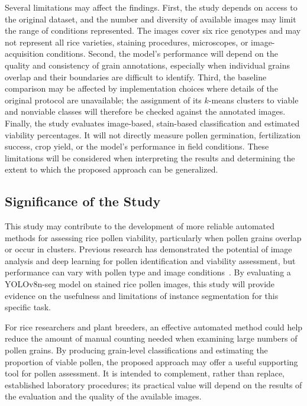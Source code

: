 Several limitations may affect the findings. First, the study depends on access to the original dataset, and the number and diversity of available images may limit the range of conditions represented. The images cover six rice genotypes and may not represent all rice varieties, staining procedures, microscopes, or image-acquisition conditions. Second, the model's performance will depend on the quality and consistency of grain annotations, especially when individual grains overlap and their boundaries are difficult to identify. Third, the baseline comparison may be affected by implementation choices where details of the original protocol are unavailable; the assignment of its $k$-means clusters to viable and nonviable classes will therefore be checked against the annotated images. Finally, the study evaluates image-based, stain-based classification and estimated viability percentages. It will not directly measure pollen germination, fertilization success, crop yield, or the model's performance in field conditions. These limitations will be considered when interpreting the results and determining the extent to which the proposed approach can be generalized.

\subsection{Significance of the Study}
\label{sec:significance}

This study may contribute to the development of more reliable automated methods for assessing rice pollen viability, particularly when pollen grains overlap or occur in clusters. Previous research has demonstrated the potential of image analysis and deep learning for pollen identification and viability assessment, but performance can vary with pollen type and image conditions~\cite{go2019,zhang2023,tan2022,li2026pvdt}. By evaluating a YOLOv8n-seg model on stained rice pollen images, this study will provide evidence on the usefulness and limitations of instance segmentation for this specific task.

For rice researchers and plant breeders, an effective automated method could help reduce the amount of manual counting needed when examining large numbers of pollen grains. By producing grain-level classifications and estimating the proportion of viable pollen, the proposed approach may offer a useful supporting tool for pollen assessment. It is intended to complement, rather than replace, established laboratory procedures; its practical value will depend on the results of the evaluation and the quality of the available images.

